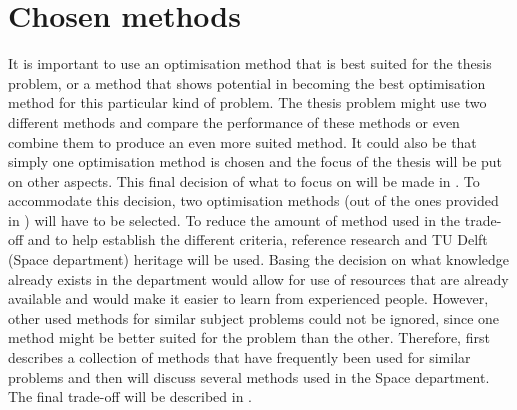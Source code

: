 


\section{Chosen methods}
\label{sec:chometh}
It is important to use an optimisation method that is best suited for the thesis problem, or a method that shows potential in becoming the best optimisation method for this particular kind of problem. The thesis problem might use two different methods and compare the performance of these methods or even combine them to produce an even more suited method. It could also be that simply one optimisation method is chosen and the focus of the thesis will be put on other aspects. This final decision of what to focus on will be made in . To accommodate this decision, two optimisation methods (out of the ones provided in ) will have to be selected. To reduce the amount of method used in the trade-off and to help establish the different criteria, reference research and TU Delft (Space department) heritage will be used. Basing the decision on what knowledge already exists in the department would allow for use of resources that are already available and would make it easier to learn from experienced people. However, other used methods for similar subject problems could not be ignored, since one method might be better suited for the problem than the other. Therefore,  first describes a collection of methods that have frequently been used for similar problems and then  will discuss several methods used in the Space department. The final trade-off will be described in .

